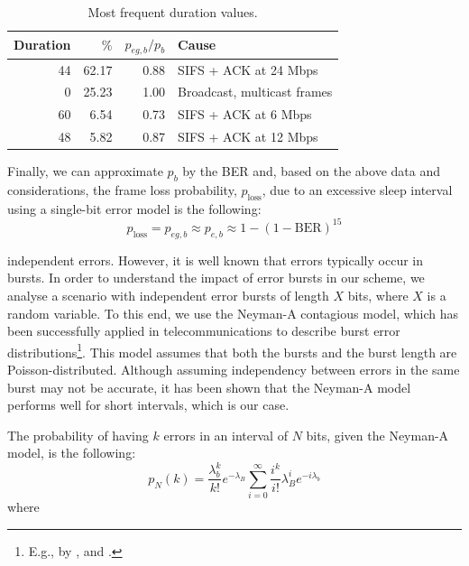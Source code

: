\documentclass[twoside,nohyper]{tufte-book}
\theoremstyle{definition}
\theoremstyle{definition}
\theoremstyle{definition}
\theoremstyle{remark}
\begin{document}
\begin{table}

\begin{center}
\begin{tabular}{rrrl}
\toprule
Duration & $\%$ & $p_{eg,b}/p_b$ & Cause\\
\midrule
44 & 62.17 & 0.88 & SIFS + ACK at 24 Mbps\\
0 & 25.23 & 1.00 & Broadcast, multicast frames\\
60 & 6.54 & 0.73 & SIFS + ACK at 6 Mbps\\
48 & 5.82 & 0.87 & SIFS + ACK at 12 Mbps\\
\bottomrule
\end{tabular}
\end{center}
\caption{\label{tab:duration}Most frequent duration values.}
\end{table}

Finally, we can approximate \(p_b\) by the BER and, based on the above
data and considerations, the frame loss probability,
\(p_{\mathrm{loss}}\), due to an excessive sleep interval using a
single-bit error model is the following:
%
\begin{equation}
 p_{\mathrm{loss}} = p_{eg,b} \approx p_{e,b} \approx 1 - (1 - \mathrm{BER})^{15}
 \label{eq:plossbit}
\end{equation}
%

 independent errors. However, it is
well known that errors typically occur in bursts. In order to understand
the impact of error bursts in our scheme, we analyse a scenario with
independent error bursts of length \(X\) bits, where \(X\) is a random
variable. To this end, we use the Neyman-A contagious
model\cite[-10mm]{neyman1939new},
which has been successfully applied in telecommunications to describe
burst error distributions\footnote{E.g., by \citet{s614},
  \citet{becam1985validite} and \citet{irvin1991monitoring}.}. This
model assumes that both the bursts and the burst length are
Poisson-distributed. Although assuming independency between errors in
the same burst may not be accurate, it has been shown that the Neyman-A
model performs well for short
intervals\cite[0pt]{cornaglia1996letter},
which is our case.

The probability of having \(k\) errors in an interval of \(N\) bits,
given the Neyman-A model, is the following:
%
\begin{equation}
 p_N(k) = \frac{\lambda_b^k}{k!}e^{-\lambda_B}\sum_{i=0}^\infty\frac{i^k}{i!}\lambda_B^i e^{-i\lambda_b}
 \label{eq:pNk}
\end{equation}
%
where
\end{document}
